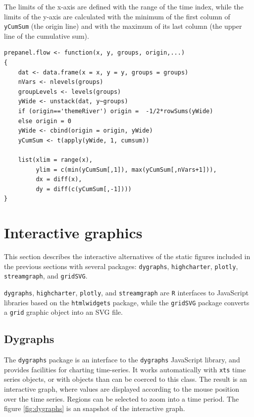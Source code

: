\documentclass[smallroyalvopaper]{memoir}
\begin{document}
The limits of the x-axis are defined with the range of the time index,
while the limits of the y-axis are calculated with the minimum of the
first column of \texttt{yCumSum} (the origin line) and with the maximum of
its last column (the upper line of the cumulative sum).

\lstset{language=r,label= ,caption= ,captionpos=b,numbers=none}
\begin{lstlisting}
prepanel.flow <- function(x, y, groups, origin,...)
{
    dat <- data.frame(x = x, y = y, groups = groups)
    nVars <- nlevels(groups)
    groupLevels <- levels(groups)
    yWide <- unstack(dat, y~groups)
    if (origin=='themeRiver') origin =  -1/2*rowSums(yWide)
    else origin = 0
    yWide <- cbind(origin = origin, yWide)
    yCumSum <- t(apply(yWide, 1, cumsum))
    
    list(xlim = range(x),
         ylim = c(min(yCumSum[,1]), max(yCumSum[,nVars+1])),
         dx = diff(x),
         dy = diff(c(yCumSum[,-1])))
}
\end{lstlisting}


\section{Interactive graphics \label{sec:interactive_horizontal}}
\label{sec:org45710f2}
This section describes the interactive alternatives of the static
figures included in the previous sections with several packages:
\texttt{dygraphs}, \texttt{highcharter}, \texttt{plotly}, \texttt{streamgraph}, and \texttt{gridSVG}.

\texttt{dygraphs}, \texttt{highcharter}, \texttt{plotly}, and \texttt{streamgraph} are \texttt{R} interfaces to
JavaScript libraries based on the \texttt{htmlwidgets} package, while the
\texttt{gridSVG} package converts a \texttt{grid} graphic object into an SVG file.

\subsection{Dygraphs \label{sec:dygraphs}}
\label{sec:orga0ce4c1}
The \texttt{dygraphs} package is an interface to the \texttt{dygraphs} JavaScript
library, and provides facilities for charting time-series. It works
automatically with \texttt{xts} time series objects, or with objects than can
be coerced to this class. The result is an interactive graph, where
values are displayed according to the mouse position over the time
series. Regions can be selected to zoom into a time period. The figure
\ref{fig:dygraphs} is an snapshot of the interactive graph.
\end{document}

